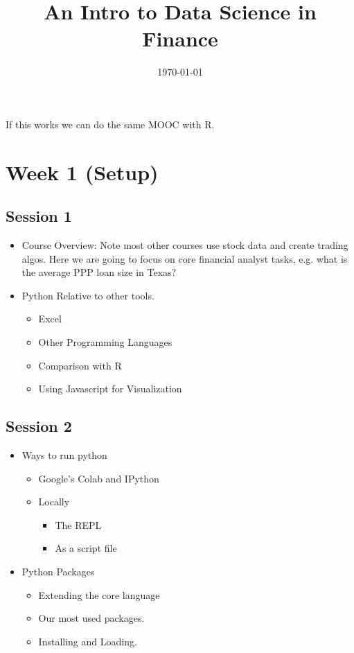 \documentclass[11pt]{article}
\date{\today}
\title{An Intro to Data Science in Finance}
\begin{document}
\maketitle
If this works we can do the same MOOC with R.

\section{Week 1 (Setup)}
\label{sec:org61c7864}

\subsection{Session 1}
\label{sec:org73de0e0}

\begin{itemize}
\item Course Overview:  Note most other courses use stock data and create trading algos.  Here we are going to focus on core financial analyst tasks, e.g. what is the average PPP loan size in Texas?
\item Python Relative to other tools.
\begin{itemize}
\item Excel
\item Other Programming Languages
\item Comparison with R
\item Using Javascript for Visualization
\end{itemize}
\end{itemize}

\subsection{Session 2}
\label{sec:org4bba20a}

\begin{itemize}
\item Ways to run python
\begin{itemize}
\item Google's Colab and IPython
\item Locally
\begin{itemize}
\item The REPL
\item As a script file
\end{itemize}
\end{itemize}
\item Python Packages
\begin{itemize}
\item Extending the core language
\item Our most used packages.
\item Installing and Loading.
\end{itemize}
\end{itemize}
\end{document}
